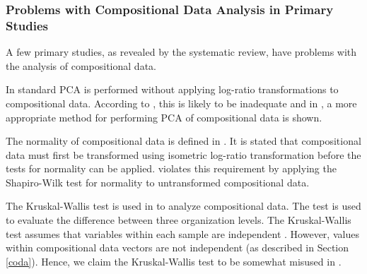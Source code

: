 \subsubsection{\label{codaProblems}Problems with Compositional Data Analysis in Primary Studies}

A few primary studies, as revealed by the systematic review, have problems with the analysis of compositional data.

In \citep{Wohlin2006,Pettersson2008} standard PCA is performed without applying log-ratio transformations to compositional data. According to \citep{Aitchison1983}, this is likely to be inadequate and in \citep{Filzmoser2007}, a more appropriate method for performing PCA of compositional data is shown.

The normality of compositional data is defined in \citep{PawlowskyGlahn2007}. It is stated that compositional data must first be transformed using isometric log-ratio transformation before the tests for normality can be applied. \citep{Jonsson2005a} violates this requirement by applying the Shapiro-Wilk test for normality to untransformed compositional data.

The Kruskal-Wallis test is used in \citep{Jonsson2005a} to analyze compositional data. The test is used to evaluate the difference between three organization levels. The Kruskal-Wallis test assumes that variables within each sample are independent \citep{Kruskal1952a}. However, values within compositional data vectors are not independent (as described in Section \ref{coda}). Hence, we claim the Kruskal-Wallis test to be somewhat misused in \citep{Jonsson2005a}.